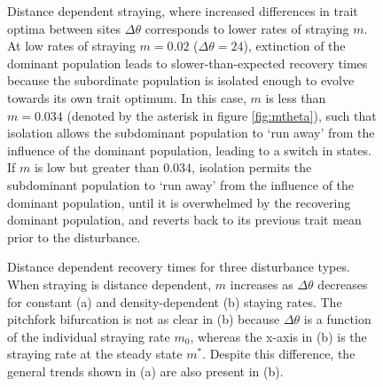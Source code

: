 \documentclass{revtex4}
\begin{document}

\begin{figure}
  \captionsetup{justification=raggedright,
singlelinecheck=false
}
\centering
\caption{
Distance dependent straying, where increased differences in trait optima between sites $\Delta\theta$ corresponds to lower rates of straying $m$.
At low rates of straying $m=0.02$ ($\Delta\theta=24$), extinction of the dominant population leads to slower-than-expected recovery times because the subordinate population is isolated enough to evolve towards its own trait optimum. %
In this case, $m$ is less than $m=0.034$ (denoted by the asterisk in figure \ref{fig:mtheta}), such that isolation allows the subdominant population to `run away' from the influence of the dominant population, leading to a switch in states.
If $m$ is low but greater than $0.034$, isolation permits the subdominant population to `run away' from the influence of the dominant population, until it is overwhelmed by the recovering dominant population, and reverts back to its previous trait mean prior to the disturbance.
} \label{fig:inertia}
\end{figure}


\begin{figure}
  \captionsetup{justification=raggedright,
singlelinecheck=false
}
  \centering
  \caption{
  Distance dependent recovery times for three disturbance types. When straying is distance dependent, $m$ increases as $\Delta\theta$ decreases for constant (a) and density-dependent (b) staying rates.
  The pitchfork bifurcation is not as clear in (b) because $\Delta\theta$ is a function of the individual straying rate $m_0$, whereas the x-axis in (b) is the straying rate at the steady state $m^*$.
  Despite this difference, the general trends shown in (a) are also present in (b).
  } \label{fig:mthetamvm}
\end{figure}
\end{document}
